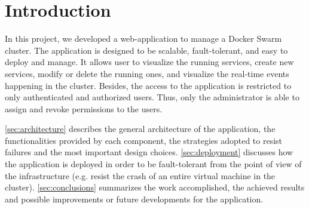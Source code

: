 \section{Introduction}
\label{sec:introduction}

In this project, we developed a web-application to manage a Docker Swarm cluster. The application is designed to be scalable, fault-tolerant, and easy to deploy and manage.
It allows user to visualize the running services, create new services, modify or delete the running ones, and visualize the real-time events happening in the cluster.
Besides, the access to the application is restricted to only authenticated and authorized users. Thus, only the administrator is able to assign and revoke permissions to the users. 

\cref{sec:architecture} describes the general architecture of the application, the functionalities provided by each component, the strategies adopted to resist failures and the most important design choices.
\cref{sec:deployment} discusses how the application is deployed in order to be fault-tolerant from the point of view of the infrastructure (e.g. resist the crash of an entire virtual machine in the cluster).
\cref{sec:conclusions} summarizes the work accomplished, the achieved results and possible improvements or future developments for the application.
